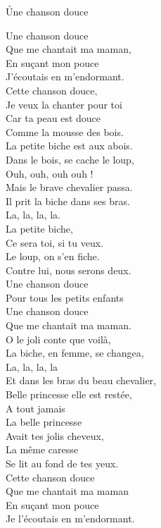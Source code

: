 \documentclass{novel}
\begin{document}
\h*{Une chanson douce}
\begin{multicols}{2}
Une chanson douce \\
Que me chantait ma maman, \\
En suçant mon pouce \\
J'écoutais en m'endormant. \\
Cette chanson douce, \\
Je veux la chanter pour toi \\
Car ta peau est douce \\
Comme la mousse des bois. \\

La petite biche est aux abois. \\
Dans le bois, se cache le loup, \\
Ouh, ouh, ouh ouh ! \\
Mais le brave chevalier passa. \\
Il prit la biche dans ses bras. \\
La, la, la, la. \\

La petite biche, \\
Ce sera toi, si tu veux. \\
Le loup, on s'en fiche. \\
Contre lui, nous serons deux. \\
Une chanson douce \\
Pour tous les petits enfants \\
Une chanson douce \\
Que me chantait ma maman. \\

O le joli conte que voilà, \\
La biche, en femme, se changea, \\
La, la, la, la \\
Et dans les bras du beau chevalier, \\
Belle princesse elle est restée, \\
A tout jamais \\

La belle princesse \\
Avait tes jolis cheveux, \\
La même caresse \\
Se lit au fond de tes yeux. \\
Cette chanson douce \\
Que me chantait ma maman \\
En suçant mon pouce \\
Je l’écoutais en m’endormant. \\
\end{multicols}
\end{document}
